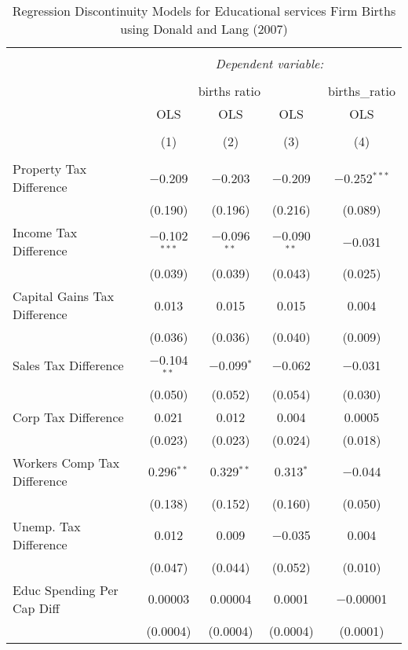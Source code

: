 
\begin{table}[!htbp] \centering 
  \caption{Regression Discontinuity Models for  Educational services Firm Births using Donald and Lang (2007)} 
  \label{} 
\begin{tabular}{@{\extracolsep{5pt}}lcccc} 
\\[-1.8ex]\hline 
\hline \\[-1.8ex] 
 & \multicolumn{4}{c}{\textit{Dependent variable:}} \\ 
\cline{2-5} 
\\[-1.8ex] & \multicolumn{3}{c}{births ratio} & births\_ratio \\ 
 & OLS & OLS & OLS & OLS \\ 
\\[-1.8ex] & (1) & (2) & (3) & (4)\\ 
\hline \\[-1.8ex] 
 Property Tax Difference & $-$0.209 & $-$0.203 & $-$0.209 & $-$0.252$^{***}$ \\ 
  & (0.190) & (0.196) & (0.216) & (0.089) \\ 
  Income Tax Difference & $-$0.102$^{***}$ & $-$0.096$^{**}$ & $-$0.090$^{**}$ & $-$0.031 \\ 
  & (0.039) & (0.039) & (0.043) & (0.025) \\ 
  Capital Gains Tax Difference & 0.013 & 0.015 & 0.015 & 0.004 \\ 
  & (0.036) & (0.036) & (0.040) & (0.009) \\ 
  Sales Tax Difference & $-$0.104$^{**}$ & $-$0.099$^{*}$ & $-$0.062 & $-$0.031 \\ 
  & (0.050) & (0.052) & (0.054) & (0.030) \\ 
  Corp Tax Difference & 0.021 & 0.012 & 0.004 & 0.0005 \\ 
  & (0.023) & (0.023) & (0.024) & (0.018) \\ 
  Workers Comp Tax Difference & 0.296$^{**}$ & 0.329$^{**}$ & 0.313$^{*}$ & $-$0.044 \\ 
  & (0.138) & (0.152) & (0.160) & (0.050) \\ 
  Unemp. Tax Difference & 0.012 & 0.009 & $-$0.035 & 0.004 \\ 
  & (0.047) & (0.044) & (0.052) & (0.010) \\ 
  Educ Spending Per Cap Diff & 0.00003 & 0.00004 & 0.0001 & $-$0.00001 \\ 
  & (0.0004) & (0.0004) & (0.0004) & (0.0001) \\ 

\end{tabular}
\end{table}
